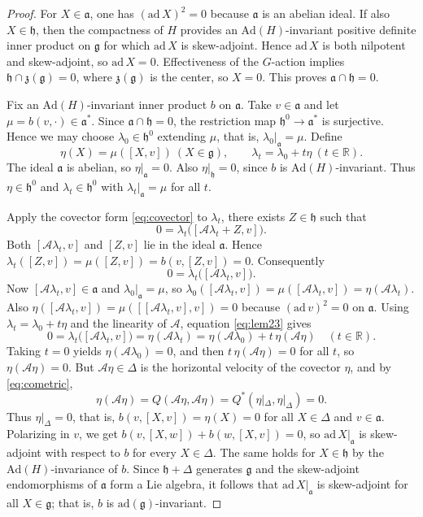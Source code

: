 \documentclass[12pt]{amsart}
\theoremstyle{plain}
\theoremstyle{definition}
\theoremstyle{remark}
\newcommand{\alg}[1]{\mathfrak{#1}}
\newcommand{\RR}{\mathbb{R}}
\begin{document}
\begin{proof}
For $X\in\alg{a}$, one has $(\mathrm{ad}\,X)^2=0$ because $\alg{a}$ is an abelian ideal. If also
$X\in\alg{h}$, then the compactness of $H$ provides an $\mathrm{Ad}(H)$-invariant positive
definite inner product on $\alg{g}$ for which $\mathrm{ad}\,X$ is skew-adjoint. Hence
$\mathrm{ad}\,X$ is both nilpotent and skew-adjoint, so $\mathrm{ad}\,X=0$. Effectiveness of the
$G$-action implies $\alg{h}\cap\alg{z}(\alg{g})=0$, where $\alg{z}(\alg{g})$ is the center, so
$X=0$. This proves $\alg{a}\cap\alg{h}=0$.

Fix an $\mathrm{Ad}(H)$-invariant inner product $b$ on $\alg{a}$. Take $v\in\alg{a}$ and let
$\mu=b(v,\cdot)\in\alg{a}^*$. Since $\alg{a}\cap\alg{h}=0$, the restriction map
$\alg{h}^0\to\alg{a}^*$ is surjective. Hence we may choose $\lambda_0\in\alg{h}^0$ extending
$\mu$, that is, $\lambda_0|_{\alg{a}}=\mu$. Define
\[ \eta(X)=\mu([X,v])\ (X\in\alg{g}),\qquad \lambda_t=\lambda_0+t\eta\ (t\in\RR). \]
The ideal $\alg{a}$ is abelian, so $\eta|_{\alg{a}}=0$. Also $\eta|_{\alg{h}}=0$, since $b$ is
$\mathrm{Ad}(H)$-invariant. Thus $\eta\in\alg{h}^0$ and $\lambda_t\in\alg{h}^0$ with
$\lambda_t|_{\alg{a}}=\mu$ for all $t$.

Apply the covector form \eqref{eq:covector} to $\lambda_t$, there exists
$Z\in\alg{h}$ such that
\[ 0=\lambda_t\big([\mathcal{A}\lambda_t+Z,v]\big). \]
Both $[\mathcal{A}\lambda_t,v]$ and $[Z,v]$ lie in the ideal $\alg{a}$. Hence
$\lambda_t([Z,v])=\mu([Z,v])=b(v,[Z,v])=0$. Consequently
\begin{equation}\label{eq:lem23}
0=\lambda_t\big([\mathcal{A}\lambda_t,v]\big).
\end{equation}
Now $[\mathcal{A}\lambda_t,v]\in\alg{a}$ and $\lambda_0|_{\alg{a}}=\mu$, so
$\lambda_0([\mathcal{A}\lambda_t,v])=\mu([\mathcal{A}\lambda_t,v])=\eta(\mathcal{A}\lambda_t)$. Also
$\eta([\mathcal{A}\lambda_t,v])=\mu([[\mathcal{A}\lambda_t,v],v])=0$ because $(\mathrm{ad}\,v)^2=0$ on $\alg{a}$.
Using $\lambda_t=\lambda_0+t\eta$ and the linearity of $\mathcal{A}$, equation \eqref{eq:lem23} gives
\[ 0=\lambda_t\big([\mathcal{A}\lambda_t,v]\big)=\eta(\mathcal{A}\lambda_t)
=\eta(\mathcal{A}\lambda_0)+t\,\eta(\mathcal{A}\eta)
\quad(t\in\RR). \]
Taking $t=0$ yields $\eta(\mathcal{A}\lambda_0)=0$, and then $t\,\eta(\mathcal{A}\eta)=0$ for all $t$, so
$\eta(\mathcal{A}\eta)=0$. But $\mathcal{A}\eta\in\Delta$ is the horizontal velocity of the covector $\eta$, and by
\eqref{eq:cometric},
\[ \eta(\mathcal{A}\eta)=Q(\mathcal{A}\eta,\mathcal{A}\eta)=Q^{*}(\eta|_{\Delta},\eta|_{\Delta})=0. \]
Thus $\eta|_{\Delta}=0$, that is, $b(v,[X,v])=\eta(X)=0$ for all $X\in\Delta$ and
$v\in\alg{a}$. Polarizing in $v$, we get $b(v,[X,w])+b(w,[X,v])=0$, so
$\mathrm{ad}\,X|_{\alg{a}}$ is skew-adjoint with respect to $b$ for every $X\in\Delta$. The same
holds for $X\in\alg{h}$ by the $\mathrm{Ad}(H)$-invariance of $b$. Since $\alg{h}+\Delta$ generates
$\alg{g}$ and the skew-adjoint endomorphisms of $\alg{a}$ form a Lie algebra, it follows that
$\mathrm{ad}\,X|_{\alg{a}}$ is skew-adjoint for all $X\in\alg{g}$; that is, $b$ is
$\mathrm{ad}(\alg{g})$-invariant.


\end{proof}
\end{document}
